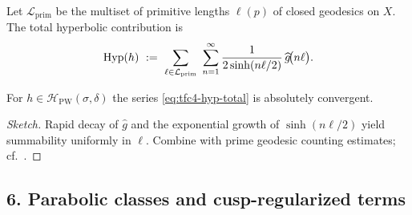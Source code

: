 \begin{definition}\relax\hspace{0pt}
\label{def:tfc4-length}\relax\hspace{0pt}
Let $\mathcal{L}_{\mathrm{prim}}$ be the multiset of primitive lengths $\ell(p)$ of closed geodesics on $X$. \relax\hspace{0pt}
The total hyperbolic contribution is
\begin{equation}\relax\hspace{0pt}
\label{eq:tfc4-hyp-total}\relax\hspace{0pt}
\mathrm{Hyp}(h)\ :=\ \sum_{\ell\in\mathcal{L}_{\mathrm{prim}}}\ \sum_{n=1}^{\infty}\frac{1}{2\sinh(n\ell/2)}\,\widehat{g}\!\big(n\ell\big).
\end{equation}
\end{definition}

\begin{lemma}\relax\hspace{0pt}
\label{lem:tfc4-hyp-abs} %
For $h\in\mathcal{H}_{\mathrm{PW}}(\sigma,\delta)$ the series \eqref{eq:tfc4-hyp-total} is absolutely convergent. \relax\hspace{0pt}
\end{lemma}

\begin{proof}[Sketch]\relax\hspace{0pt}
Rapid decay of $\widehat{g}$ and the exponential growth of $\sinh(n\ell/2)$ yield summability uniformly in $\ell$. \relax\hspace{0pt}
Combine with prime geodesic counting estimates; cf.\ \cite{HejhalI,IwaniecSpectral,Borthwick}.\relax\hspace{0pt}
\end{proof}

\subsection*{6. Parabolic classes and cusp-regularized terms}\relax\hspace{0pt}
\label{subsec:tfc4-par} %


